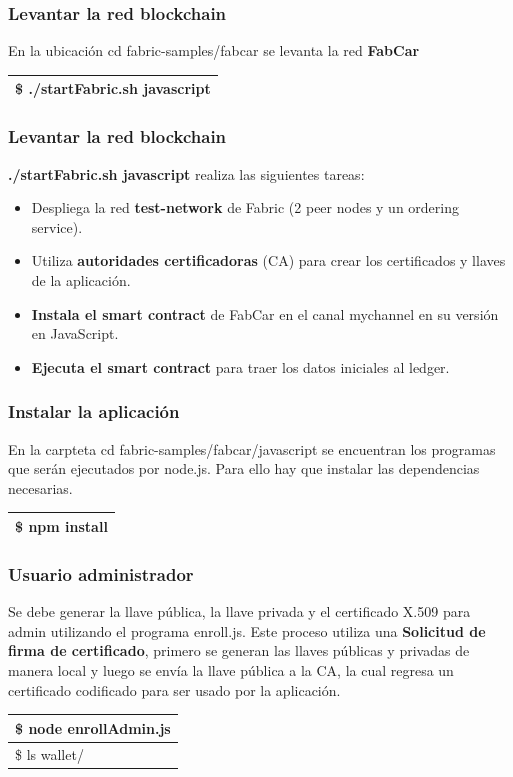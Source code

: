 \documentclass{beamer}
\begin{document}
	\begin{frame}
		\frametitle{Levantar la red blockchain}
		En la ubicación cd fabric-samples/fabcar se levanta la red \textbf{FabCar}
		\begin{center}
			\begin{tabulary}{\linewidth}{L}
				\hline
				\$ ./startFabric.sh javascript \\
				\hline
			\end{tabulary} 
		\end{center}
	\end{frame}
	
	\begin{frame}
		\frametitle{Levantar la red blockchain}
		\textbf{./startFabric.sh javascript} realiza las siguientes tareas:
		\begin{itemize}
			\item Despliega la red \textbf{test-network} de Fabric (2 peer nodes y un ordering service).
			\item Utiliza \textbf{autoridades certificadoras} (CA) para crear los certificados y llaves de la aplicación.
			\item \textbf{Instala el smart contract} de FabCar en el canal mychannel en su versión en JavaScript.
			\item \textbf{Ejecuta el smart contract} para traer los datos iniciales al ledger.
		\end{itemize}
	\end{frame}
	
	\begin{frame}
		\frametitle{Instalar la aplicación}
		En la carpteta cd fabric-samples/fabcar/javascript se encuentran los programas que serán ejecutados por node.js. Para ello hay que instalar las dependencias necesarias.
		\begin{center}
			\begin{tabulary}{\linewidth}{L}
				\hline
				\$ npm install \\
				\hline
			\end{tabulary} 
		\end{center}
	\end{frame}
	
	\begin{frame}
		\frametitle{Usuario administrador}
		Se debe generar la llave pública, la llave privada y el certificado X.509 para admin utilizando el programa enroll.js. Este proceso utiliza una \textbf{Solicitud de firma de certificado}, primero se generan las llaves públicas y privadas de manera local y luego se envía la llave pública a la CA, la cual regresa un certificado codificado para ser usado por la aplicación. 
		\begin{center}
			\begin{tabulary}{\linewidth}{L}
				\hline
				\$ node enrollAdmin.js \\
				\hline
				\$ ls wallet/ \\
				\hline
			\end{tabulary} 
		\end{center}
	\end{frame}
\end{document}
